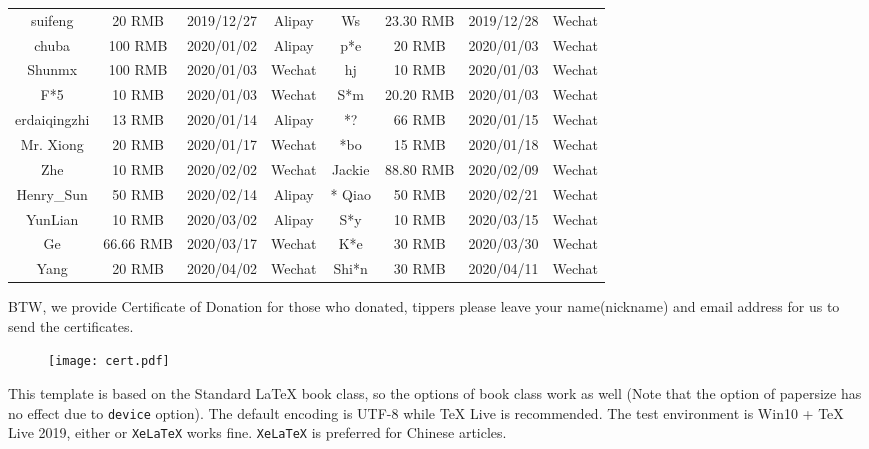 \documentclass[11pt,fancy,twocol,twoside]{elegantbook}
\begin{document}
\begin{table}[!htb]
\begin{tabular}{*{4}{>{\scriptsize}c}|*{4}{>{\scriptsize}c}}
    suifeng   & 20 RMB & 2019/12/27 & Alipay   & Ws    & 23.30 RMB & 2019/12/28 & Wechat \\
    chuba    & 100 RMB  & 2020/01/02 & Alipay   & p*e   & 20 RMB & 2020/01/03 & Wechat \\
    Shunmx & 100 RMB & 2020/01/03 & Wechat    & hj    & 10 RMB & 2020/01/03 & Wechat \\
    F*5   & 10 RMB & 2020/01/03 & Wechat    & S*m   & 20.20 RMB & 2020/01/03 & Wechat \\
    erdaiqingzhi  & 13 RMB & 2020/01/14 & Alipay   & *?    & 66 RMB & 2020/01/15 & Wechat \\
    Mr. Xiong & 20 RMB & 2020/01/17 & Wechat    & *bo    & 15 RMB & 2020/01/18 & Wechat \\
    *Zhe    & 10 RMB & 2020/02/02 & Wechat    &  Jackie &  88.80 RMB  &  2020/02/09 & Wechat \\
    Henry\_Sun & 50 RMB & 2020/02/14 & Alipay & * Qiao  & 50 RMB & 2020/02/21 & Wechat \\
    YunLian & 10 RMB & 2020/03/02 & Alipay & S*y  &  10 RMB  &  2020/03/15 & Wechat \\
    * Ge  & 66.66 RMB & 2020/03/17 & Wechat    &   K*e & 30 RMB & 2020/03/30 & Wechat\\
    * Yang  &  20 RMB  &  2020/04/02 & Wechat & Shi*n  & 30 RMB & 2020/04/11 & Wechat \\
    \bottomrule
  \end{tabular}%
  \label{tab:donation}%
\end{table}%

BTW, we provide Certificate of Donation for those who donated, tippers please leave your name(nickname) and email address for us to send the certificates.

\begin{figure}[!htb]
  \centering
  \texttt{[image: cert.pdf]}
\end{figure}



This template is based on the Standard \LaTeX{} book class, so the options of book class work as well (Note that the option of papersize has no effect due to \lstinline{device} option). The default encoding is UTF-8 while \TeX{} Live is recommended. The test environment is Win10 + \TeX{} Live 2019, either  or \lstinline{XeLaTeX} works fine. \lstinline{XeLaTeX} is preferred for Chinese articles.
\end{document}
